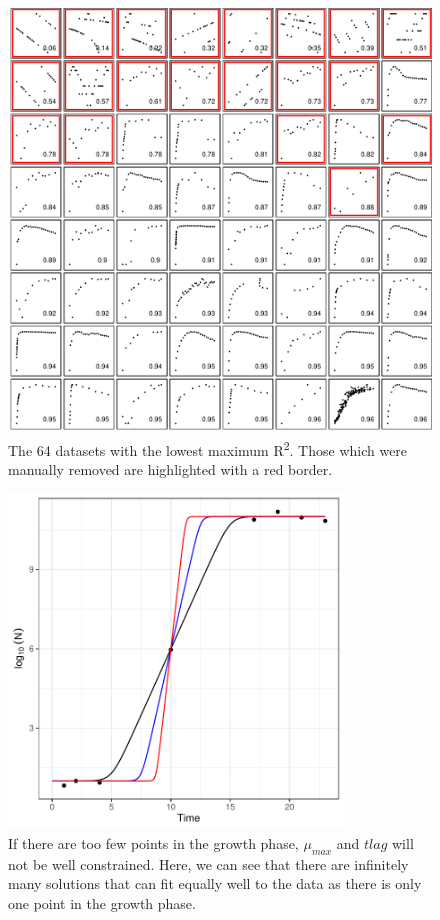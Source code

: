 \documentclass[11pt, a4paper]{article}
\begin{document}
        
         \begin{figure}[H]
        \includegraphics[width=\linewidth]{../results/removed_ids.pdf}
        \caption{The 64 datasets with the lowest maximum R\textsuperscript{2}. Those which were manually removed are highlighted with a red border.}
        \label{sup:removed_ids}
        \end{figure}
        
                 \begin{figure}[H]
        \includegraphics[width=3.5in]{../results/constraint_demo.pdf}
        \centering
        \caption{If there are too few points in the growth phase, $\mu_{max}$ and $t{lag}$ will not be well constrained. Here, we can see that there are infinitely many solutions that can fit equally well to the data as there is only one point in the growth phase. }
        \label{sup:constraint}
        \end{figure}  
\end{document}
